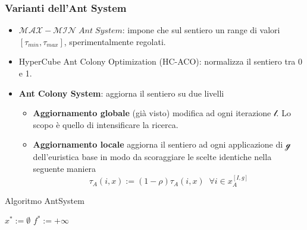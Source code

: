 \documentclass{article}
\begin{document}
\subsubsection{Varianti dell'Ant System}
\begin{itemize}
    \item $\mathcal{MAX-MIN}\;Ant\;System$: impone che sul sentiero un range di valori
          $[\tau_{min},\tau_{max}]$, sperimentalmente regolati.
    \item HyperCube Ant Colony Optimization (HC-ACO): normalizza il sentiero tra 0 e 1.
    \item \textbf{Ant Colony System}: aggiorna il sentiero su due livelli
          \begin{itemize}
              \item \textbf{Aggiornamento globale} (già visto) modifica ad ogni iterazione $\mathcal{l}$.
                    Lo scopo è quello di intensificare la ricerca.
              \item \textbf{Aggiornamento locale} aggiorna il sentiero ad ogni applicazione di $\mathcal{g}$
                    dell'euristica base in modo da scoraggiare le scelte identiche nella seguente maniera
                    $$\tau_A(i,x):=(1-\rho)\tau_A(i,x)\;\;\forall i\in x_A^{[I,g]}$$
          \end{itemize}
\end{itemize}


\begin{algorithm}[H]
    \caption{Algoritmo AntSystem}
    \label{alg:ant_system}
    \begin{algorithmic}
        \State $x^*:=\emptyset$
        \State $f^*:=+\infty$
        \EndIf
        \EndFor
        \EndFor
    \end{algorithmic}
\end{algorithm}
\end{document}
